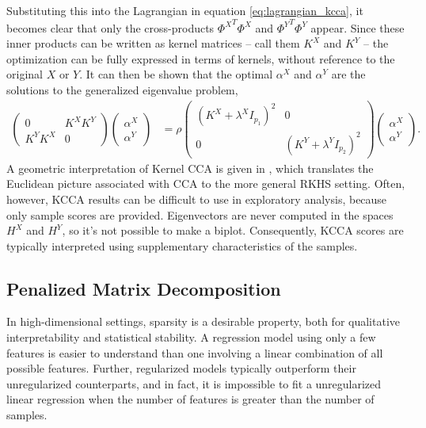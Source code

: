 \documentclass{article}
\begin{document}
Substituting this into the Lagrangian in equation \ref{eq:lagrangian_kcca}, it
becomes clear that only the cross-products ${\Phi^X}^{T}\Phi^{X}$ and
${\Phi^{Y}}^{T} \Phi^{Y}$ appear. Since these inner products can be written as
kernel matrices -- call them $K^{X}$ and $K^{Y}$ -- the optimization can be
fully expressed in terms of kernels, without reference to the original $X$ or
$Y$. It can then be shown that the optimal $\alpha^{X}$ and $\alpha^{Y}$ are the
solutions to the generalized eigenvalue problem,
\begin{align*}
  \begin{pmatrix}
    0 & K^{X}K^{Y} \\
    K^{Y}K^{X} & 0
  \end{pmatrix}
  \begin{pmatrix}
    \alpha^{X} \\
    \alpha^{Y}
  \end{pmatrix}
&= \rho
\begin{pmatrix}
  \left(K^{X} + \lambda^{X}I_{p_{1}}\right)^{2} & 0 \\
  0 & \left(K^{Y} + \lambda^{Y}I_{p_{2}}\right)^{2}
\end{pmatrix}
\begin{pmatrix}
  \alpha^{X} \\
  \alpha^{Y}
\end{pmatrix}.
\end{align*}
A geometric interpretation of Kernel CCA is given in \cite{kuss2003geometry},
which translates the Euclidean picture associated with CCA to the more general
RKHS setting. Often, however, KCCA results can be difficult to use in
exploratory analysis, because only sample scores are provided. Eigenvectors are
never computed in the spaces $H^{X}$ and $H^{Y}$, so it's not possible to make a
biplot. Consequently, KCCA scores are typically interpreted using supplementary
characteristics of the samples.

\subsection{Penalized Matrix Decomposition}
\label{subsec:pmd}

In high-dimensional settings, sparsity is a desirable property, both for
qualitative interpretability and statistical stability. A regression model using
only a few features is easier to understand than one involving a linear
combination of all possible features. Further, regularized models typically
outperform their unregularized counterparts, and in fact, it is impossible to
fit a unregularized linear regression when the number of features is greater
than the number of samples.
\end{document}
